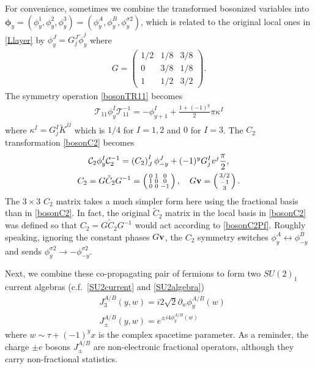 For convenience, sometimes we combine the transformed bosonized variables into $\boldsymbol\phi_y=(\phi^1_y,\phi^2_y,\phi^3_y)=(\phi^A_y,\phi^B_y,\phi^{\sigma2}_y)$, which is related to the original local ones in \eqref{Llayer} by $\phi^J_y=G^J_j\tilde\phi^j_y$ where \begin{align}G=\begin{pmatrix}1/2&1/8&3/8\\0&3/8&1/8\\1&1/2&3/2\end{pmatrix}.\end{align} The \AFTR symmetry operation \eqref{bosonTR11} becomes \begin{align}\mathcal{T}_{11}\phi^I_y\mathcal{T}_{11}^{-1}=-\phi^I_{y+1}+\frac{1+(-1)^y}{2}\pi\kappa^I\label{bosonTR11Pf}
\end{align} where $\kappa^I=G^I_j\tilde{K}^{jj}$ which is $1/4$ for $I=1,2$ and $0$ for $I=3$. The $C_2$ transformation \eqref{bosonC2} becomes \begin{gather}\mathcal{C}_2\phi^I_y\mathcal{C}_2^{-1}=\left(C_2\right)^I_J\phi^J_{-y}+(-1)^yG^I_jv^j\frac{\pi}{2},\label{bosonC2Pf}\\C_2=G\tilde{C}_2G^{-1}=\left(\begin{smallmatrix}0&1&0\\1&0&0\\0&0&-1\end{smallmatrix}\right),\quad G{\bf v}=\left(\begin{smallmatrix}3/2\\-1\\3\end{smallmatrix}\right).\nonumber\end{gather} The $3\times3$ $C_2$ matrix takes a much simpler form here using the fractional basis than in \eqref{bosonC2}. In fact, the original $\tilde{C}_2$ matrix in the local basis in \eqref{bosonC2} was defined so that $C_2=G\tilde{C}_2G^{-1}$ would act according to \eqref{bosonC2Pf}. Roughly speaking, ignoring the constant phases $G{\bf v}$, the $C_2$ symmetry switches $\phi^A_y\leftrightarrow\phi^B_{-y}$ and sends $\phi^{\sigma2}_y\to-\phi^{\sigma2}_{-y}$.

Next, we combine these co-propagating pair of fermions to form two $SU(2)_1$ current algebras (c.f.~\eqref{SU2current} and \eqref{SU2algebra}) \begin{align}&J_3^{A/B}(y,w)=i2\sqrt{2}\partial_w\phi^{A/B}_y(w)\nonumber\\&J_\pm^{A/B}(y,w)=e^{\pm i4\phi^{A/B}_y(w)}%
\end{align} where $w\sim\tau+(-1)^yx$ is the complex spacetime parameter. As a reminder, the charge $\pm e$ bosons $J^{A/B}_\pm$ are non-electronic fractional operators, although they carry non-fractional statistics.

